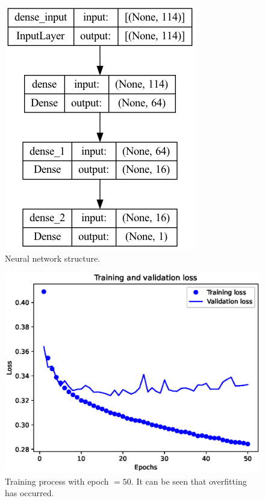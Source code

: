 \documentclass[11pt, a4paper, jou]{apa7}
\begin{document}
\begin{table}[h]
    \centering
    \caption{Classification results of SVM with gaussian kernel function and using PCA on the test set. }
    \label{tab:SVM_gauss_PCA_summary}
\end{table}

\begin{figure}[h]
    \centering
    \caption{Neural network structure. }\label{fig:NN}
    \includegraphics[width=.3\textwidth]{figures/Network_structure.png}
\end{figure}

\begin{figure}[h]
    \centering
    \caption{Training process with epoch $=50$. It can be seen that overfitting has occurred. }\label{fig:NN_process_50}
    \includegraphics[width=.45\textwidth]{figures/error_50.eps}
\end{figure}
\end{document}
